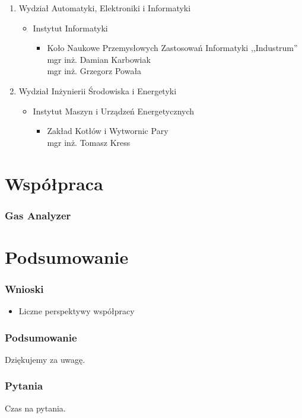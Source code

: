 \documentclass[ucs]{beamer}
\begin{document}
\begin{frame}
\begin{enumerate}
\item Wydział Automatyki, Elektroniki i Informatyki
\begin{itemize}
\item Instytut Informatyki
\begin{itemize}
\item Koło Naukowe Przemysłowych Zastosowań Informatyki ,,Industrum''
\\ mgr inż. Damian Karbowiak
\\ mgr inż. Grzegorz Powała
\end{itemize}
\end{itemize}
\item  Wydział Inżynierii Środowiska i Energetyki
\begin{itemize}
\item Instytut Maszyn i Urządzeń Energetycznych
\begin{itemize}
\item Zakład Kotłów i Wytwornic Pary
\\ mgr inż. Tomasz Kress
\end{itemize}
\end{itemize}
\end{enumerate}
\end{frame}


\section{Współpraca}
\begin{frame}
\frametitle{Gas Analyzer}
\end{frame}

\section{Podsumowanie}
\begin{frame}
\frametitle{Wnioski}
\begin{itemize}
\item Liczne perspektywy współpracy
\end{itemize}
\end{frame}

\begin{frame}
\frametitle{Podsumowanie}
Dziękujemy za uwagę.
\end{frame}

\begin{frame}
\frametitle{Pytania}
Czas na pytania.
\end{frame}
\end{document}
